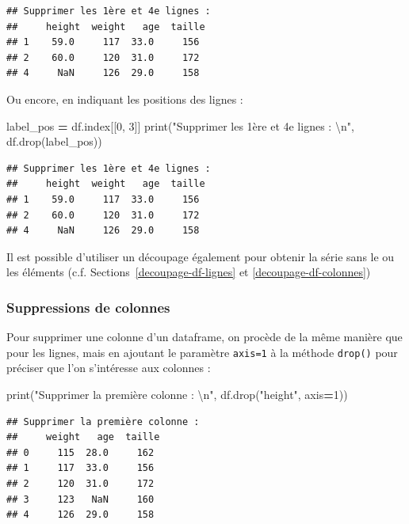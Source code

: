 \documentclass[12pt,]{book}
\newenvironment{Shaded}{\begin{snugshade}}{\end{snugshade}}
\newcommand{\DecValTok}[1]{\textcolor[rgb]{0.00,0.00,0.81}{#1}}
\newcommand{\CharTok}[1]{\textcolor[rgb]{0.31,0.60,0.02}{#1}}
\newcommand{\StringTok}[1]{\textcolor[rgb]{0.31,0.60,0.02}{#1}}
\newcommand{\OperatorTok}[1]{\textcolor[rgb]{0.81,0.36,0.00}{\textbf{#1}}}
\newcommand{\BuiltInTok}[1]{#1}
\newcommand{\NormalTok}[1]{#1}
\numberwithin{equation}{section}
\numberwithin{countremarque}{section}
\begin{document}
\begin{lstlisting}
## Supprimer les 1ère et 4e lignes :  
##     height  weight   age  taille
## 1    59.0     117  33.0     156
## 2    60.0     120  31.0     172
## 4     NaN     126  29.0     158
\end{lstlisting}

Ou encore, en indiquant les positions des lignes :

\begin{Shaded}
\begin{Highlighting}[]
\NormalTok{label_pos }\OperatorTok{=}\NormalTok{ df.index[[}\DecValTok{0}\NormalTok{, }\DecValTok{3}\NormalTok{]]}
\BuiltInTok{print}\NormalTok{(}\StringTok{"Supprimer les 1ère et 4e lignes :  }\CharTok{\textbackslash{}n}\StringTok{"}\NormalTok{, df.drop(label_pos))}
\end{Highlighting}
\end{Shaded}

\begin{lstlisting}
## Supprimer les 1ère et 4e lignes :  
##     height  weight   age  taille
## 1    59.0     117  33.0     156
## 2    60.0     120  31.0     172
## 4     NaN     126  29.0     158
\end{lstlisting}

Il est possible d'utiliser un découpage également pour obtenir la série
sans le ou les éléments (c.f. Sections~\ref{decoupage-df-lignes} et
\ref{decoupage-df-colonnes})

\subsubsection{Suppressions de colonnes}\label{suppressions-de-colonnes}

Pour supprimer une colonne d'un dataframe, on procède de la même manière
que pour les lignes, mais en ajoutant le paramètre \texttt{axis=1} à la
méthode \texttt{drop()} pour préciser que l'on s'intéresse aux colonnes
:

\begin{Shaded}
\begin{Highlighting}[]
\BuiltInTok{print}\NormalTok{(}\StringTok{"Supprimer la première colonne :  }\CharTok{\textbackslash{}n}\StringTok{"}\NormalTok{, df.drop(}\StringTok{"height"}\NormalTok{, axis}\OperatorTok{=}\DecValTok{1}\NormalTok{))}
\end{Highlighting}
\end{Shaded}

\begin{lstlisting}
## Supprimer la première colonne :  
##     weight   age  taille
## 0     115  28.0     162
## 1     117  33.0     156
## 2     120  31.0     172
## 3     123   NaN     160
## 4     126  29.0     158
\end{lstlisting}
\end{document}
